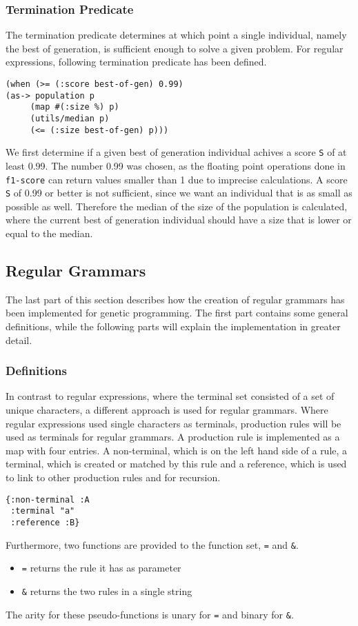 \documentclass[runningheads]{llncs}
\begin{document}
\subsubsection{Termination Predicate}
The termination predicate determines at which point a single individual, namely the best of generation, is sufficient enough to solve a given problem. For regular expressions, following termination predicate has been defined.
\begin{lstlisting}
(when (>= (:score best-of-gen) 0.99)
(as-> population p
     (map #(:size %) p)
     (utils/median p)
     (<= (:size best-of-gen) p)))
\end{lstlisting}

We first determine if a given best of generation individual achives a score \texttt{S} of at least 0.99. The number 0.99 was chosen, as the floating point operations done in \texttt{f1-score} can return values smaller than 1 due to imprecise calculations. A score \texttt{S} of 0.99 or better is not sufficient, since we want an individual that is as small as possible as well. Therefore the median of the size of the population is calculated, where the current best of generation individual should have a size that is lower or equal to the median.

\subsection{Regular Grammars}
The last part of this section describes how the creation of regular grammars has been implemented for genetic programming. The first part contains some general definitions, while the following parts will explain the implementation in greater detail.

\subsubsection{Definitions}
In contrast to regular expressions, where the terminal set consisted of a set of unique characters, a different approach is used for regular grammars. Where regular expressions used single characters as terminals, production rules will be used as terminals for regular grammars. A production rule is implemented as a map with four entries. A non-terminal, which is on the left hand side of a rule, a terminal, which is created or matched by this rule and a reference, which is used to link to other production rules and for recursion.
\begin{verbatim}
{:non-terminal :A
 :terminal "a"
 :reference :B}
\end{verbatim}
Furthermore, two functions are provided to the function set, \texttt{=} and \texttt{\&}.
\begin{itemize}
\item \texttt{=} returns the rule it has as parameter
\item \texttt{\&} returns the two rules in a single string
\end{itemize}
The arity for these pseudo-functions is unary for \texttt{=} and binary for \texttt{\&}.
\end{document}
